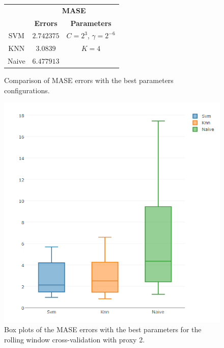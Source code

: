 \begin{figure}[!h]
\centering
\begin{tabular}{|c|c|c|}
   \hline
   & \multicolumn{2}{|c|}{\textbf{MASE}} \\ \cline{2-3}
   & \textbf{Errors} & \textbf{Parameters}          \\ \hline
   SVM  & $2.742375$        & $C = 2^3$, $\gamma = 2^{-6}$          \\ 
   KNN & $3.0839$ & $K = 4$ \\ 
   Naive & $6.477913$ &      \\ 
   \hline
   \end{tabular}
\caption{Comparison of MASE errors with the best parameters configurations.}
\label{fig:table6mMASEp2}
\centering
\includegraphics[width=\linewidth]{img/6mproxy2MASE.png}
\caption{Box plots of the MASE errors with the best parameters for the rolling window cross-validation with proxy 2.}
\end{figure}